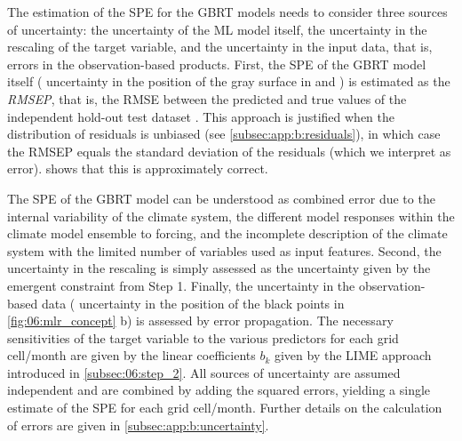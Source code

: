 The estimation of the \acf{SPE} for the \ac{GBRT} models needs to consider
three sources of uncertainty: the uncertainty of the \ac{ML} model itself, the
uncertainty in the rescaling of the target variable, and the uncertainty in the
input data, that is, errors in the observation-based products. First, the
\ac{SPE} of the \ac{GBRT} model itself (\ie{} uncertainty in the position of
the gray surface in 
 and
) is estimated as the
\emph{\acf{RMSEP}}, that is, the \ac{RMSE} between the predicted and true
values of the independent hold-out test dataset \autocite{Bishop2006}. This
approach is justified when the distribution of residuals is unbiased (see
\cref{subsec:app:b:residuals}), in which case the \ac{RMSEP} equals the
standard deviation of the residuals (which we interpret as error).
 shows that this is approximately correct.

The \ac{SPE} of the \ac{GBRT} model can be understood as combined error due to
the internal variability of the climate system, the different model responses
within the climate model ensemble to forcing, and the incomplete description of
the climate system with the limited number of variables used as input features.
Second, the uncertainty in the rescaling is simply assessed as the uncertainty
given by the emergent constraint from Step 1. Finally, the uncertainty in the
observation-based data (\ie{} uncertainty in the position of the black points
in \cref{fig:06:mlr_concept}{\color{BrownRed} b}) is assessed by error
propagation. The necessary sensitivities of the target variable to the various
predictors for each grid cell/month are given by the linear coefficients $b_k$
given by the \ac{LIME} approach introduced in \cref{subsec:06:step_2}. All
sources of uncertainty are assumed independent and are combined by adding the
squared errors, yielding a single estimate of the \ac{SPE} for each grid
cell/month. Further details on the calculation of errors are given in
\cref{subsec:app:b:uncertainty}.

